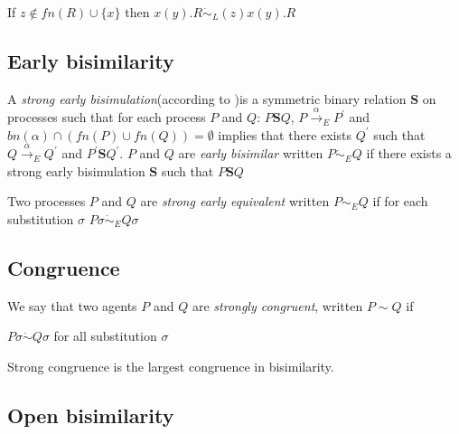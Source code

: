 \begin{example}
  If $z\notin fn(R)\cup \{x\}$ then $x(y).R \dot{\sim}_{L} (z)x(y).R$
\end{example}



\subsection{Early bisimilarity}

\begin{definition}
  A \emph{strong early bisimulation}(according to \cite{parrow})is a symmetric binary relation $\mathbf{S}$ on processes such that for each process $P$ and $Q$: $P\mathbf{S} Q$, $P \xrightarrow{\alpha}_{E} P^{'}$ and $bn(\alpha) \cap (fn(P) \cup fn(Q))=\emptyset$ implies that there exists $Q^{'}$ such that $Q \xrightarrow{\alpha}_{E} Q^{'}$ and $P^{'}\mathbf{S}Q^{'}$. $P$ and $Q$ are \emph{early bisimilar} written $P\dot{\sim}_{E}Q$ if there exists a strong early bisimulation $\mathbf{S}$ such that $P\mathbf{S}Q$
\end{definition}

\begin{definition}
  Two processes $P$ and $Q$ are \emph{strong early equivalent} written $P\sim_{E}Q$ if for each substitution $\sigma$ $P\sigma \dot{\sim}_{E}Q\sigma$
\end{definition}



\subsection{Congruence}

\begin{definition}
  We say that two agents $P$ and $Q$ are \emph{strongly congruent}, written $P\sim Q$ if
  \begin{center}
    $P\sigma \dot{\sim} Q\sigma$ for all substitution $\sigma$    
  \end{center}
\end{definition}

\begin{proposition}
  Strong congruence is the largest congruence in bisimilarity.
\end{proposition}


\subsection{Open bisimilarity}


